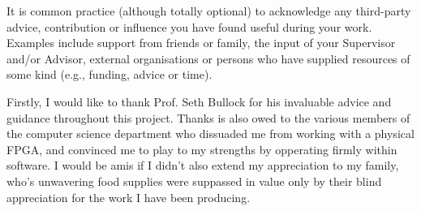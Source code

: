 \noindent
{
	\color{red}
It is common practice (although totally optional) to acknowledge any
third-party advice, contribution or influence you have found useful
during your work.  Examples include support from friends or family, 
the input of your Supervisor and/or Advisor, external organisations 
or persons who  have supplied resources of some kind (e.g., funding, 
advice or time).
}

Firstly, I would like to thank Prof. Seth Bullock for his invaluable
advice and guidance throughout this project.
Thanks is also owed to the various members of the computer science department
who dissuaded me from working with a physical FPGA, and convinced me to play to my strengths
by opperating firmly within software. I would be amis if I didn't also extend
my appreciation to my family, who's unwavering food supplies were suppassed in value only by
their blind appreciation for the work I have been producing.
